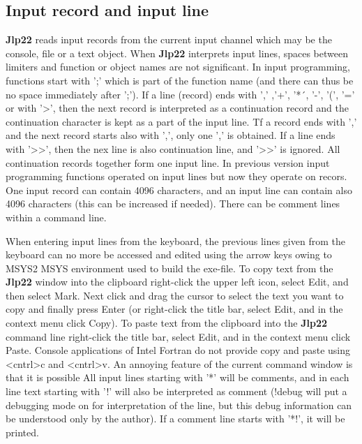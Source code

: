 \subsection{Input record and input line} 
\label{inpuline} 
\textbf{Jlp22} reads input records from the current input channel which may be the console, file or a text object. 
When \textbf{Jlp22} interprets input lines, spaces between limiters and function or object names are not 
significant. In input programming, functions start with ';' which is part of the function name (and 
there can thus be no space immediately after ';'). If a line (record) ends with ',' ,'+', '*´, '-', 
'(', '=' or with '>', then the next record is interpreted as a continuation record and 
the continuation character is kept as a part of the input 
line. Tf a record ends with ',' and the next record starts also with ',', only one ',' is obtained. If a line ends with '>{}>', then 
the nex line is also continuation line, and  '>{}>' is ignored. All continuation 
records together form one input line. In previous version input programming functions operated on input lines 
but now they operate on recors. One input record can contain 4096 characters, and an input line can contain also 4096 characters 
(this can be increased if needed). 
There can be comment lines within a command line. 
 
When entering input lines from the keyboard, the previous lines given from the keyboard can no more be 
accessed and edited using the arrow keys owing to MSYS2 MSYS environment used to build the exe-file. 
To copy text from the \textbf{Jlp22} window into the clipboard right-click the upper left icon, select Edit, 
and then select Mark. Next click and drag the cursor to select the text you want to copy and 
finally press Enter (or right-click the title bar, select Edit, and in the context menu click Copy). 
To paste text from the clipboard into the \textbf{Jlp22} command line right-click the title bar, select Edit, 
and in the context menu click Paste. Console applications of Intel Fortran do not provide copy 
and paste using <cntrl>c and <cntrl>v. An annoying feature of the current command window is that it is possible 
All input lines starting with '*' will be comments, and in each line text starting with '!' will also 
be interpreted as comment (!debug will put a debugging mode on for interpretation of the 
line, but this debug information can be understood only by the author). If a comment line starts 
with '*!', it will be printed. 

